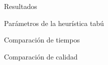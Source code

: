 \documentclass[12pt,titlepage]{article}
\begin{document}
	\newpage

	

	\newpage

	
	
	\newpage
	
	
	
	\newpage
	
	\begin{section}{Resultados}
		\begin{subsection}{Parámetros de la heurística tabú}
		\end{subsection}		

		\begin{subsection}{Comparación de tiempos}
		\end{subsection}

		\begin{subsection}{Comparación de calidad}
		\end{subsection}
	\end{section}
\end{document}
